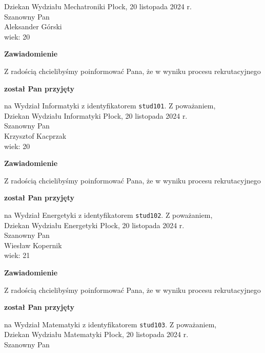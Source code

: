 \documentclass[12pt,a4paper]{article}
\begin{document}
Dziekan
Wydziału Mechatroniki
\newpage
\hfill Płock, 20 listopada 2024 r.\\
\noindent 
Szanowny Pan \\
Aleksander Górski \\
wiek: 20
\bigskip
\begin{center}
 	{\Large\textbf{Zawiadomienie}}
\end{center}
\bigskip
Z radością chcielibyśmy poinformować Pana, że w wyniku procesu rekrutacyjnego 
\begin{center}
\textsf{\textbf{został Pan przyjęty}} 
\end{center}
na Wydział Informatyki z identyfikatorem \verb|stud101|. 
\vspace{2cm}
\noindent
Z poważaniem,\\
Dziekan
Wydziału Informatyki
\newpage
\hfill Płock, 20 listopada 2024 r.\\
\noindent 
Szanowny Pan \\
Krzysztof Kacprzak \\
wiek: 20
\bigskip
\begin{center}
 	{\Large\textbf{Zawiadomienie}}
\end{center}
\bigskip
Z radością chcielibyśmy poinformować Pana, że w wyniku procesu rekrutacyjnego 
\begin{center}
\textsf{\textbf{został Pan przyjęty}} 
\end{center}
na Wydział Energetyki z identyfikatorem \verb|stud102|. 
\vspace{2cm}
\noindent
Z poważaniem,\\
Dziekan
Wydziału Energetyki
\newpage
\hfill Płock, 20 listopada 2024 r.\\
\noindent 
Szanowny Pan \\
Wiesław Kopernik \\
wiek: 21
\bigskip
\begin{center}
 	{\Large\textbf{Zawiadomienie}}
\end{center}
\bigskip
Z radością chcielibyśmy poinformować Pana, że w wyniku procesu rekrutacyjnego 
\begin{center}
\textsf{\textbf{został Pan przyjęty}} 
\end{center}
na Wydział Matematyki z identyfikatorem \verb|stud103|. 
\vspace{2cm}
\noindent
Z poważaniem,\\
Dziekan
Wydziału Matematyki
\newpage
\hfill Płock, 20 listopada 2024 r.\\
\noindent 
Szanowny Pan \\
\end{document}
